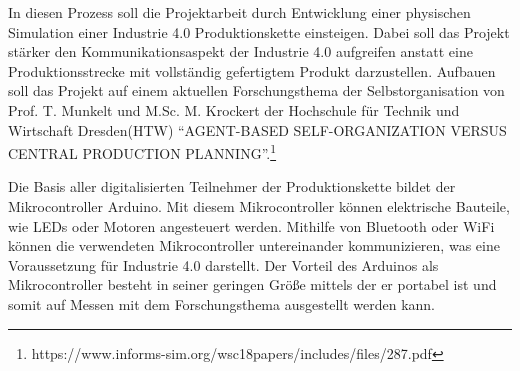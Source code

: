 In diesen Prozess soll die Projektarbeit durch Entwicklung einer physischen Simulation einer Industrie 4.0 Produktionskette einsteigen. Dabei soll das Projekt stärker den Kommunikationsaspekt der Industrie 4.0 aufgreifen anstatt eine Produktionsstrecke mit vollständig gefertigtem Produkt darzustellen. Aufbauen soll das Projekt auf einem aktuellen Forschungsthema der Selbstorganisation von Prof. T. Munkelt und M.Sc. M. Krockert der Hochschule für Technik und Wirtschaft Dresden(HTW) \enquote{AGENT-BASED SELF-ORGANIZATION VERSUS CENTRAL PRODUCTION PLANNING}.\footnote{https://www.informs-sim.org/wsc18papers/includes/files/287.pdf} 

Die Basis aller digitalisierten Teilnehmer der Produktionskette bildet der Mikrocontroller Arduino. Mit diesem Mikrocontroller können elektrische Bauteile, wie LEDs oder Motoren angesteuert werden. Mithilfe von Bluetooth oder WiFi können die verwendeten Mikrocontroller untereinander kommunizieren, was eine Voraussetzung für Industrie 4.0 darstellt. Der Vorteil des Arduinos als Mikrocontroller besteht in seiner geringen Größe mittels der er portabel ist und somit auf Messen mit dem Forschungsthema ausgestellt werden kann.  